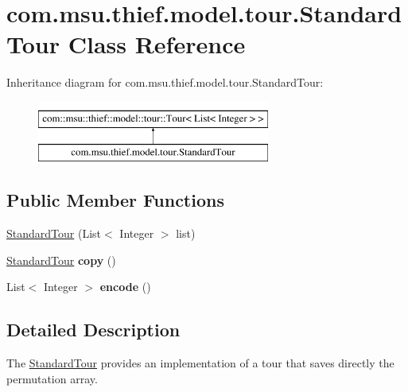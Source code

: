 \hypertarget{classcom_1_1msu_1_1thief_1_1model_1_1tour_1_1StandardTour}{\section{com.\-msu.\-thief.\-model.\-tour.\-Standard\-Tour Class Reference}
\label{classcom_1_1msu_1_1thief_1_1model_1_1tour_1_1StandardTour}
}
Inheritance diagram for com.\-msu.\-thief.\-model.\-tour.\-Standard\-Tour\-:\begin{figure}[H]
\begin{center}
\leavevmode
\includegraphics[height=2.000000cm]{classcom_1_1msu_1_1thief_1_1model_1_1tour_1_1StandardTour}
\end{center}
\end{figure}
\subsection*{Public Member Functions}
\begin{DoxyCompactItemize}
\item 
\hyperlink{classcom_1_1msu_1_1thief_1_1model_1_1tour_1_1StandardTour_a4098e8ce7d6c6067e7f83e8c558dc337}{Standard\-Tour} (List$<$ Integer $>$ list)
\item 
\hypertarget{classcom_1_1msu_1_1thief_1_1model_1_1tour_1_1StandardTour_aa31fa8362030accd4ee1a5fd04926b9e}{\hyperlink{classcom_1_1msu_1_1thief_1_1model_1_1tour_1_1StandardTour}{Standard\-Tour} {\bfseries copy} ()}\label{classcom_1_1msu_1_1thief_1_1model_1_1tour_1_1StandardTour_aa31fa8362030accd4ee1a5fd04926b9e}

\item 
\hypertarget{classcom_1_1msu_1_1thief_1_1model_1_1tour_1_1StandardTour_a3b08ec6d020b2e8ab7c3b00adf09f6ed}{List$<$ Integer $>$ {\bfseries encode} ()}\label{classcom_1_1msu_1_1thief_1_1model_1_1tour_1_1StandardTour_a3b08ec6d020b2e8ab7c3b00adf09f6ed}

\end{DoxyCompactItemize}


\subsection{Detailed Description}
The \hyperlink{classcom_1_1msu_1_1thief_1_1model_1_1tour_1_1StandardTour}{Standard\-Tour} provides an implementation of a tour that saves directly the permutation array.

